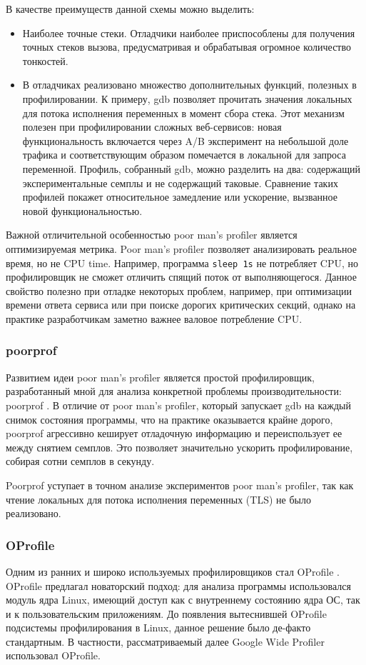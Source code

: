 В качестве преимуществ данной схемы можно выделить:
\begin{itemize}
    \item
        Наиболее точные стеки. Отладчики наиболее приспособлены для получения точных стеков вызова,
        предусматривая и обрабатывая огромное количество тонкостей.
    \item
        В отладчиках реализовано множество дополнительных функций, полезных в профилировании.
        К примеру, gdb позволяет прочитать значения локальных для потока исполнения переменных в момент сбора стека.
        Этот механизм полезен при профилировании сложных веб-сервисов: новая функциональность включается через A/B
        эксперимент на небольшой доле трафика и соответствующим образом помечается в локальной для запроса переменной.
        Профиль, собранный gdb, можно разделить на два: содержащий экспериментальные семплы и не содержащий таковые.
        Сравнение таких профилей покажет относительное замедление или ускорение, вызванное новой функциональностью.
\end{itemize}

Важной отличительной особенностью poor man's profiler является оптимизируемая метрика.
Poor man's profiler позволяет анализировать реальное время, но не CPU time.
Например, программа \verb!sleep 1s! не потребляет CPU, но профилировщик не сможет отличить спящий поток от выполняющегося.
Данное свойство полезно при отладке некоторых проблем, например, при оптимизации времени ответа сервиса или при поиске
дорогих критических секций, однако на практике разработчикам заметно важнее валовое потребление CPU.

\subsubsection{poorprof}
Развитием идеи poor man's profiler является простой профилировщик,
разработанный мной для анализа конкретной проблемы производительности: poorprof \cite{poorprof}.
В отличие от poor man's profiler, который запускает gdb на каждый снимок состояния программы,
что на практике оказывается крайне дорого, poorprof агрессивно кеширует отладочную информацию и переиспользует ее между снятием семплов.
Это позволяет значительно ускорить профилирование, собирая сотни семплов в секунду.

Poorprof уступает в точном анализе экспериментов poor man's profiler,
так как чтение локальных для потока исполнения переменных (TLS) не было реализовано.

\subsubsection{OProfile}
Одним из ранних и широко используемых профилировщиков стал OProfile \cite{oprofile}.
OProfile предлагал новаторский подход: для анализа программы использовался модуль ядра Linux, имеющий доступ как с внутреннему состоянию
ядра ОС, так и к пользовательским приложениям. До появления вытеснившей OProfile подсистемы профилирования в Linux, данное решение было
де-факто стандартным. В частности, рассматриваемый далее Google Wide Profiler \cite{gwp} использовал OProfile.

